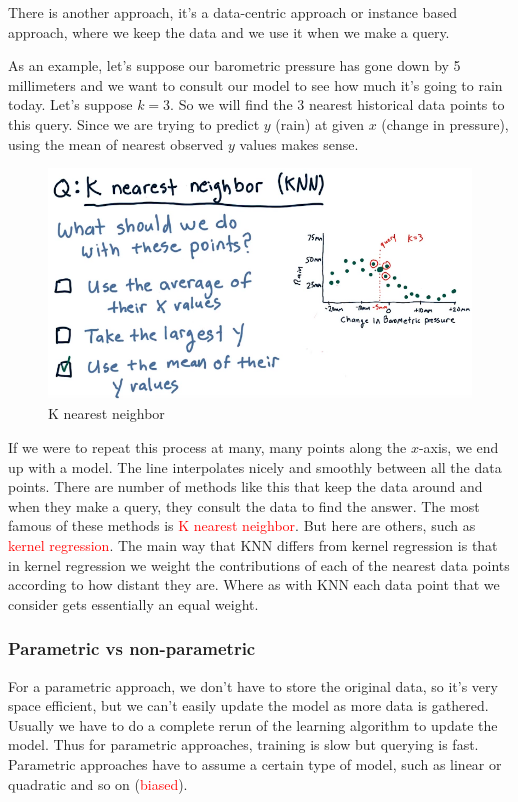 \documentclass[12pt]{article}
\begin{document}
There is another approach, it's a data-centric approach or instance based approach, where we keep the data and we use it when we make a query. 

As an example, let's suppose our barometric pressure has gone down by 5 millimeters and we want to consult our model to see how much it's going to rain today. Let's suppose $k=3$. So we will find the 3 nearest historical data points to this query. Since we are trying to predict $y$ (rain) at given $x$ (change in pressure), using the mean of nearest observed $y$ values makes sense. 

\begin{figure}[!ht]
\centering
\includegraphics[scale=0.4]{fig/fig83}
\caption{K nearest neighbor}
\end{figure}

If we were to repeat this process at many, many points along the $x$-axis, we end up with a model. The line interpolates nicely and smoothly between all the data points. There are number of methods like this that keep the data around and when they make a query, they consult the data to find the answer. The most famous of these methods is \textcolor{red}{K nearest neighbor}. But here are others, such as \textcolor{red}{kernel regression}. The main way that KNN differs from kernel regression is that in kernel regression we weight the contributions of each of the nearest data points according to how distant they are. Where as with KNN each data point that we consider gets essentially an equal weight. 

\subsubsection{Parametric vs non-parametric}

For a parametric approach, we don't have to store the original data, so it's very space efficient, but we can't easily update the model as more data is gathered. Usually we have to do a complete rerun of the learning algorithm to update the model. Thus for parametric approaches, training is slow but querying is fast. Parametric approaches have to assume a certain type of model, such as linear or quadratic and so on (\textcolor{red}{biased}).  
\end{document}

